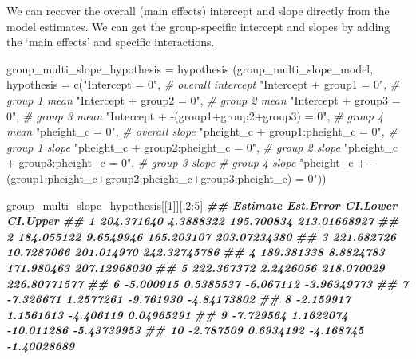 \documentclass[
]{book}
\newenvironment{Shaded}{\begin{snugshade}}{\end{snugshade}}
\newcommand{\AttributeTok}[1]{\textcolor[rgb]{0.77,0.63,0.00}{#1}}
\newcommand{\CommentTok}[1]{\textcolor[rgb]{0.56,0.35,0.01}{\textit{#1}}}
\newcommand{\DecValTok}[1]{\textcolor[rgb]{0.00,0.00,0.81}{#1}}
\newcommand{\DocumentationTok}[1]{\textcolor[rgb]{0.56,0.35,0.01}{\textbf{\textit{#1}}}}
\newcommand{\FunctionTok}[1]{\textcolor[rgb]{0.00,0.00,0.00}{#1}}
\newcommand{\NormalTok}[1]{#1}
\newcommand{\OtherTok}[1]{\textcolor[rgb]{0.56,0.35,0.01}{#1}}
\newcommand{\SpecialCharTok}[1]{\textcolor[rgb]{0.00,0.00,0.00}{#1}}
\newcommand{\StringTok}[1]{\textcolor[rgb]{0.31,0.60,0.02}{#1}}
\begin{document}
We can recover the overall (main effects) intercept and slope directly from the model estimates. We can get the group-specific intercept and slopes by adding the `main effects' and specific interactions.

\begin{Shaded}
\begin{Highlighting}[]
\NormalTok{group\_multi\_slope\_hypothesis }\OtherTok{=} 
  \FunctionTok{hypothesis}\NormalTok{ (group\_multi\_slope\_model,}
              \AttributeTok{hypothesis =} 
                \FunctionTok{c}\NormalTok{(}\StringTok{"Intercept = 0"}\NormalTok{, }\CommentTok{\# overall intercept}
                  \StringTok{"Intercept + group1 = 0"}\NormalTok{, }\CommentTok{\# group 1 mean}
                  \StringTok{"Intercept + group2 = 0"}\NormalTok{, }\CommentTok{\# group 2 mean}
                  \StringTok{"Intercept + group3 = 0"}\NormalTok{, }\CommentTok{\# group 3 mean}
                  \StringTok{"Intercept + {-}(group1+group2+group3) = 0"}\NormalTok{, }\CommentTok{\# group 4 mean}
                  \StringTok{"pheight\_c = 0"}\NormalTok{, }\CommentTok{\# overall slope}
                  \StringTok{"pheight\_c + group1:pheight\_c = 0"}\NormalTok{, }\CommentTok{\# group 1 slope}
                  \StringTok{"pheight\_c + group2:pheight\_c = 0"}\NormalTok{, }\CommentTok{\# group 2 slope}
                  \StringTok{"pheight\_c + group3:pheight\_c = 0"}\NormalTok{, }\CommentTok{\# group 3 slope}
                  \CommentTok{\# group 4 slope}
                  \StringTok{"pheight\_c +   }
\StringTok{                  {-}(group1:pheight\_c+group2:pheight\_c+group3:pheight\_c) = 0"}\NormalTok{))}
\end{Highlighting}
\end{Shaded}

\begin{Shaded}
\begin{Highlighting}[]
\NormalTok{group\_multi\_slope\_hypothesis[[}\DecValTok{1}\NormalTok{]][,}\DecValTok{2}\SpecialCharTok{:}\DecValTok{5}\NormalTok{]}
\DocumentationTok{\#\#      Estimate  Est.Error   CI.Lower     CI.Upper}
\DocumentationTok{\#\# 1  204.371640  4.3888322 195.700834 213.01668927}
\DocumentationTok{\#\# 2  184.055122  9.6549946 165.203107 203.07234380}
\DocumentationTok{\#\# 3  221.682726 10.7287066 201.014970 242.32745786}
\DocumentationTok{\#\# 4  189.381338  8.8824783 171.980463 207.12968030}
\DocumentationTok{\#\# 5  222.367372  2.2426056 218.070029 226.80771577}
\DocumentationTok{\#\# 6   {-}5.000915  0.5385537  {-}6.067112  {-}3.96349773}
\DocumentationTok{\#\# 7   {-}7.326671  1.2577261  {-}9.761930  {-}4.84173802}
\DocumentationTok{\#\# 8   {-}2.159917  1.1561613  {-}4.406119   0.04965291}
\DocumentationTok{\#\# 9   {-}7.729564  1.1622074 {-}10.011286  {-}5.43739953}
\DocumentationTok{\#\# 10  {-}2.787509  0.6934192  {-}4.168745  {-}1.40028689}
\end{Highlighting}
\end{Shaded}
\end{document}
